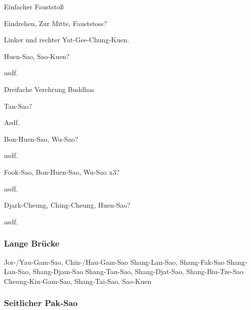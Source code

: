 
\begin{WTSatz}{Einfacher Fauststo{\ss}}%
	\begin{WTSatzTeil}{Eindrehen, Zur Mitte, Fauststoss}{?}
		
		Linker und rechter Yat-Gee-Chung-Kuen.
	\end{WTSatzTeil}
	\begin{WTSatzTeil}{Huen-Sao, Sao-Kuen}{?}
		
		asdf.
	\end{WTSatzTeil}
\end{WTSatz}


\begin{WTSatz}{Dreifache Verehrung Buddhas}%
	\begin{WTSatzTeil}{Tan-Sao}{?}
		
		Asdf.
	\end{WTSatzTeil}
	\begin{WTSatzTeil}{Bon-Huen-Sao, Wu-Sao}{?}
		
		asdf.
	\end{WTSatzTeil}
	\begin{WTSatzTeil}{Fook-Sao, Bon-Huen-Sao, Wu-Sao x3}{?}
		
		asdf.
	\end{WTSatzTeil}
	\begin{WTSatzTeil}{Djark-Cheung, Ching-Cheung, Huen-Sao}{?}
		
		asdf.
	\end{WTSatzTeil}
\end{WTSatz}


\subsubsection{Lange Br\"ucke} %

Jor-/Yau-Gam-Sao, Chin-/Hau-Gam-Sao
Shang-Lan-Sao, Shang-Fak-Sao
Shang-Lan-Sao, Shang-Djam-Sao
Shang-Tan-Sao, Shang-Djat-Sao, Shang-Biu-Tze-Sao
Cheung-Kiu-Gam-Sao, Shang-Tai-Sao, Sao-Kuen

\subsubsection{Seitlicher Pak-Sao} %

